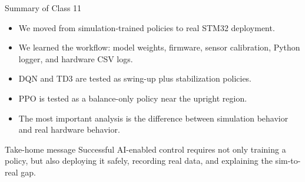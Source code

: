 \documentclass[aspectratio=169]{beamer}
\begin{document}
\begin{frame}{Summary of Class 11}

\begin{itemize}
    \item We moved from simulation-trained policies to real STM32 deployment.
    \vspace{0.2cm}

    \item We learned the workflow:
    model weights, firmware, sensor calibration, Python logger, and hardware CSV logs.
    \vspace{0.2cm}

    \item DQN and TD3 are tested as swing-up plus stabilization policies.
    \vspace{0.2cm}

    \item PPO is tested as a balance-only policy near the upright region.
    \vspace{0.2cm}

    \item The most important analysis is the difference between simulation behavior and real hardware behavior.
\end{itemize}

\vspace{0.2cm}

\begin{alertblock}{Take-home message}
\small
Successful AI-enabled control requires not only training a policy, but also deploying it safely, recording real data, and explaining the sim-to-real gap.
\end{alertblock}

\end{frame}
\end{document}
